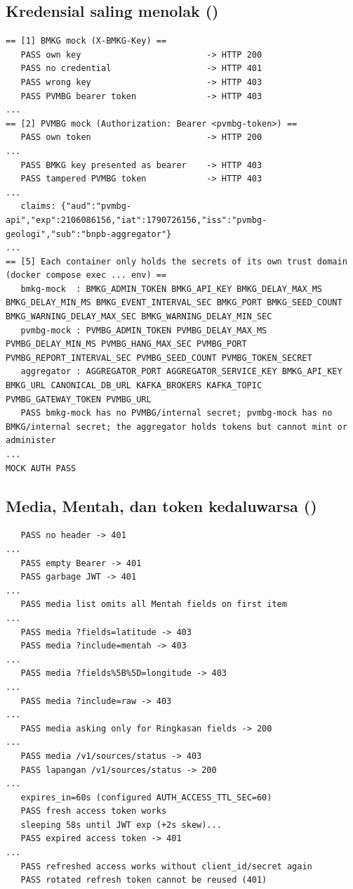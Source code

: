 \subsection*{Kredensial saling menolak ()}
\begin{lstlisting}
== [1] BMKG mock (X-BMKG-Key) ==
   PASS own key                         -> HTTP 200
   PASS no credential                   -> HTTP 401
   PASS wrong key                       -> HTTP 403
   PASS PVMBG bearer token              -> HTTP 403
...
== [2] PVMBG mock (Authorization: Bearer <pvmbg-token>) ==
   PASS own token                       -> HTTP 200
...
   PASS BMKG key presented as bearer    -> HTTP 403
   PASS tampered PVMBG token            -> HTTP 403
...
   claims: {"aud":"pvmbg-api","exp":2106086156,"iat":1790726156,"iss":"pvmbg-geologi","sub":"bnpb-aggregator"}
...
== [5] Each container only holds the secrets of its own trust domain (docker compose exec ... env) ==
   bmkg-mock  : BMKG_ADMIN_TOKEN BMKG_API_KEY BMKG_DELAY_MAX_MS BMKG_DELAY_MIN_MS BMKG_EVENT_INTERVAL_SEC BMKG_PORT BMKG_SEED_COUNT BMKG_WARNING_DELAY_MAX_SEC BMKG_WARNING_DELAY_MIN_SEC
   pvmbg-mock : PVMBG_ADMIN_TOKEN PVMBG_DELAY_MAX_MS PVMBG_DELAY_MIN_MS PVMBG_HANG_MAX_SEC PVMBG_PORT PVMBG_REPORT_INTERVAL_SEC PVMBG_SEED_COUNT PVMBG_TOKEN_SECRET
   aggregator : AGGREGATOR_PORT AGGREGATOR_SERVICE_KEY BMKG_API_KEY BMKG_URL CANONICAL_DB_URL KAFKA_BROKERS KAFKA_TOPIC PVMBG_GATEWAY_TOKEN PVMBG_URL
   PASS bmkg-mock has no PVMBG/internal secret; pvmbg-mock has no BMKG/internal secret; the aggregator holds tokens but cannot mint or administer
...
MOCK AUTH PASS
\end{lstlisting}

\subsection*{Media, Mentah, dan token kedaluwarsa ()}
\begin{lstlisting}
   PASS no header -> 401
...
   PASS empty Bearer -> 401
   PASS garbage JWT -> 401
...
   PASS media list omits all Mentah fields on first item
...
   PASS media ?fields=latitude -> 403
   PASS media ?include=mentah -> 403
...
   PASS media ?fields%5B%5D=longitude -> 403
...
   PASS media ?include=raw -> 403
...
   PASS media asking only for Ringkasan fields -> 200
...
   PASS media /v1/sources/status -> 403
   PASS lapangan /v1/sources/status -> 200
...
   expires_in=60s (configured AUTH_ACCESS_TTL_SEC=60)
   PASS fresh access token works
   sleeping 58s until JWT exp (+2s skew)...
   PASS expired access token -> 401
...
   PASS refreshed access works without client_id/secret again
   PASS rotated refresh token cannot be reused (401)
\end{lstlisting}

